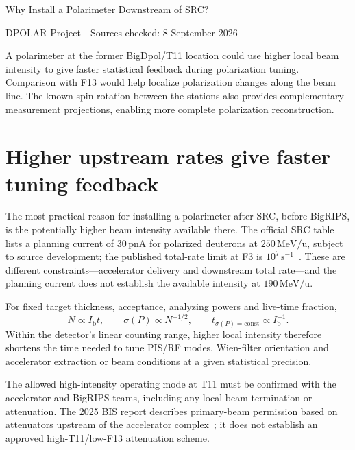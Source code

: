 \documentclass[11pt,a4paper]{article}
\begin{document}
\thispagestyle{empty}
\begin{center}
{\LARGE\sffamily\color{ink}Why Install a Polarimeter Downstream of SRC?}\par\vspace{10pt}
DPOLAR Project\quad---\quad Sources checked: 8 September 2026
\end{center}
\vspace{5pt}
\noindent
A polarimeter at the former BigDpol/T11 location could use higher local beam intensity to give faster statistical feedback during polarization tuning. Comparison with F13 would help localize polarization changes along the beam line. The known spin rotation between the stations also provides complementary measurement projections, enabling more complete polarization reconstruction.

\section{Higher upstream rates give faster tuning feedback}

The most practical reason for installing a polarimeter after SRC, before BigRIPS, is the potentially higher beam intensity available there. The official SRC table lists a planning current of $30\,\mathrm{pnA}$ for polarized deuterons at $250\,\mathrm{MeV/u}$, subject to source development; the published total-rate limit at F3 is $10^7\,\mathrm{s^{-1}}$~\cite{current,limit}. These are different constraints---accelerator delivery and downstream total rate---and the planning current does not establish the available intensity at $190\,\mathrm{MeV/u}$.

For fixed target thickness, acceptance, analyzing powers and live-time fraction,
\begin{equation}
 N\propto I_{\mathrm b}t,\qquad
 \sigma(P)\propto N^{-1/2},\qquad
 t_{\sigma(P)=\mathrm{const}}\propto I_{\mathrm b}^{-1}.
\end{equation}
Within the detector's linear counting range, higher local intensity therefore shortens the time needed to tune PIS/RF modes, Wien-filter orientation and accelerator extraction or beam conditions at a given statistical precision.

The allowed high-intensity operating mode at T11 must be confirmed with the accelerator and BigRIPS teams, including any local beam termination or attenuation. The 2025 BIS report describes primary-beam permission based on attenuators upstream of the accelerator complex~\cite{bis}; it does not establish an approved high-T11/low-F13 attenuation scheme.
\end{document}
